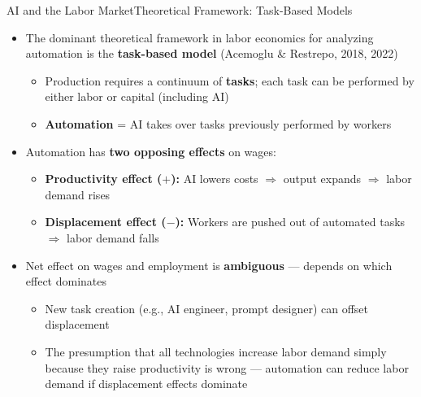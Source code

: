 \documentclass[hyperref={pdfpagelabels=false}]{beamer}
\begin{document}
\begin{frame}{AI and the Labor Market}{Theoretical Framework: Task-Based Models}
	\begin{itemize}
		\item The dominant theoretical framework in labor economics for analyzing automation is the \textbf{task-based model} (Acemoglu \& Restrepo, 2018, 2022)
		\vspace{0.2cm}
		\begin{itemize}
			\item Production requires a continuum of \textbf{tasks}; each task can be performed by either labor or capital (including AI)
			\vspace{0.1cm}
			\item \textbf{Automation} = AI takes over tasks previously performed by workers
		\end{itemize}
		\vspace{0.3cm}
		\item Automation has \textbf{two opposing effects} on wages:
		\vspace{0.1cm}
		\begin{itemize}
			\item \textbf{Productivity effect ($+$):} AI lowers costs $\Rightarrow$ output expands $\Rightarrow$ labor demand rises
			\vspace{0.1cm}
			\item \textbf{Displacement effect ($-$):} Workers are pushed out of automated tasks $\Rightarrow$ labor demand falls
		\end{itemize}
		\vspace{0.3cm}
		\item Net effect on wages and employment is \textbf{ambiguous} --- depends on which effect dominates
		\vspace{0.1cm}
		\begin{itemize}
			\item New task creation (e.g., AI engineer, prompt designer) can offset displacement
			\item The presumption that all technologies increase labor demand simply because they raise productivity is wrong --- automation can reduce labor demand if displacement effects dominate 
		\end{itemize}
	\end{itemize}
\end{frame}
\end{document}
